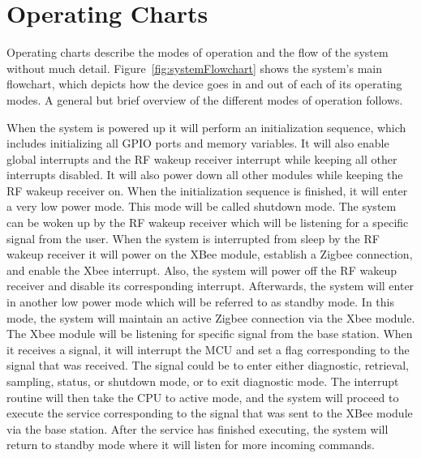 \section{Operating Charts}
Operating charts describe the modes of operation and the flow of the system without much detail. Figure~\ref{fig:systemFlowchart} shows the system's main flowchart, which depicts how the device goes in and out of each of its operating modes.  A general but brief overview of the different modes of operation follows.

When the system is powered up it will perform an initialization sequence, which includes initializing all GPIO ports and memory variables. It will also enable global interrupts and the RF wakeup receiver interrupt while keeping all other interrupts disabled. It will also power down all other modules while keeping the RF wakeup receiver on.
When the initialization sequence is finished, it will enter a very low power mode. This mode will be called shutdown mode. The system can be woken up by the RF wakeup receiver which will be listening for a specific signal from the user. When the system is interrupted from sleep by the RF wakeup receiver it will power on the XBee module, establish a Zigbee connection, and enable the Xbee interrupt. Also, the system will power off the RF wakeup receiver and disable its corresponding interrupt.
Afterwards, the system will enter in another low power mode which will be referred to as standby mode. In this mode, the system will maintain an active Zigbee connection via the Xbee module. The Xbee module will be listening for specific signal from the base station. When it receives a signal, it will interrupt the MCU and set a flag corresponding to the signal that was received. The signal could be to enter either diagnostic, retrieval, sampling, status, or shutdown mode, or to exit diagnostic mode. The interrupt routine will then take the CPU to active mode, and the system will proceed to execute the service corresponding to the signal that was sent to the XBee module via the base station. After the service has finished executing, the system will return to standby mode where it will listen for more incoming commands.


